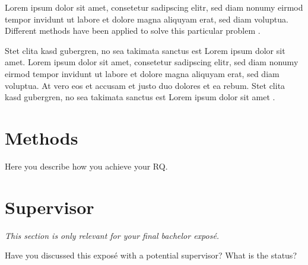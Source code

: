 \documentclass[12pt,a4paper]{article}
\begin{document}
Lorem ipsum dolor sit amet, consetetur sadipscing elitr, sed diam nonumy eirmod tempor invidunt ut labore et dolore magna aliquyam erat, sed diam voluptua. Different methods have been applied to solve this particular problem \autocite[]{McConnell:2004:CCS:1096143,Vandevoorde:2002}. 

Stet clita kasd gubergren, no sea takimata sanctus est Lorem ipsum dolor sit amet. Lorem ipsum dolor sit amet, consetetur sadipscing elitr, sed diam nonumy eirmod tempor invidunt ut labore et dolore magna aliquyam erat, sed diam voluptua. At vero eos et accusam et justo duo dolores et ea rebum. Stet clita kasd gubergren, no sea takimata sanctus est Lorem ipsum dolor sit amet .

\section*{Methods}

Here you describe how you achieve your RQ.

\printbibliography

\section*{Supervisor}

\textit{This section is only relevant for your final bachelor exposé.}

Have you discussed this exposé with a potential supervisor?
What is the status?
\end{document}
